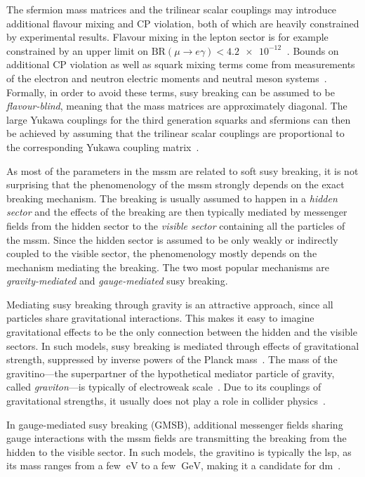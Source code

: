 The sfermion mass matrices and the trilinear scalar couplings may introduce additional flavour mixing and CP violation, both of which are heavily constrained by experimental results. Flavour mixing in the lepton sector is for example constrained by an upper limit on \mbox{$\mathrm{BR}(\mu\rightarrow e\gamma)<\SI{4.2e-12}{}$} \cite{Mori:2016vwi}. Bounds on additional CP violation as well as squark mixing terms come from measurements of the electron and neutron electric moments and neutral meson systems~\cite{pdg2020}. Formally, in order to avoid these terms, \gls{susy} breaking can be assumed to be \textit{flavour-blind}, meaning that the mass matrices are approximately diagonal. The large Yukawa couplings for the third generation squarks and sfermions can then be achieved by assuming that the trilinear scalar couplings are proportional to the corresponding Yukawa coupling matrix~\cite{Martin:1997ns}.

As most of the parameters in the \gls{mssm} are related to soft \gls{susy} breaking, it is not surprising that the phenomenology of the \gls{mssm} strongly depends on the exact breaking mechanism. The breaking is usually assumed to happen in a \textit{hidden sector} and the effects of the breaking are then typically mediated by messenger fields from the hidden sector to the \textit{visible sector} containing all the particles of the \gls{mssm}. Since the hidden sector is assumed to be only weakly or indirectly coupled to the visible sector, the phenomenology mostly depends on the mechanism mediating the breaking. The two most popular mechanisms are \textit{gravity-mediated} and \textit{gauge-mediated} \gls{susy} breaking.

Mediating \gls{susy} breaking through gravity is an attractive approach, since all particles share gravitational interactions. This makes it easy to imagine gravitational effects to be the only connection between the hidden and the visible sectors. In such models, \gls{susy} breaking is mediated through effects of gravitational strength, suppressed by inverse powers of the Planck mass~\cite{pdg2020}. The mass of the gravitino---the superpartner of the hypothetical mediator particle of gravity, called \textit{graviton}---is typically of electroweak scale~\cite{Nilles:1983ge,LAHANAS19871}. Due to its couplings of gravitational strengths, it usually does not play a role in collider physics~\cite{pdg2020}.

In gauge-mediated \gls{susy} breaking (GMSB), additional messenger fields sharing gauge interactions with the \gls{mssm} fields are transmitting the breaking from the hidden to the visible sector. In such models, the gravitino is typically the \gls{lsp}, as its mass ranges from a few $\SI{}{\eV}$ to a few $\SI{}{\GeV}$, making it a candidate for \gls{dm}~\cite{Feng:2003xh}.


